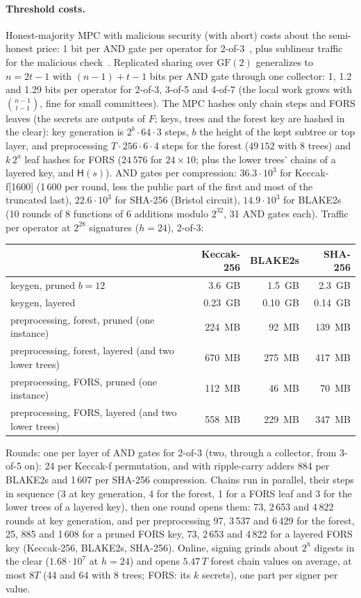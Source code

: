 \documentclass[11pt]{article}
\newcommand{\hash}{\mathsf{H}}
\begin{document}
\paragraph{Threshold costs.} Honest-majority MPC with malicious security (with abort) costs about the semi-honest
price: 1 bit per AND gate per operator for 2-of-3~\cite{AFLNO16}, plus sublinear traffic for the malicious
check~\cite{BGIN19,GS20}. Replicated sharing over $\mathrm{GF}(2)$ generalizes to $n=2t-1$ with $(n-1)+t-1$ bits per
AND gate through one collector: 1, 1.2 and 1.29 bits per operator for 2-of-3, 3-of-5 and 4-of-7 (the local work grows
with $\binom{n-1}{t-1}$, fine for small committees). The MPC hashes only chain steps and FORS leaves (the secrets are outputs
of $F$; keys, trees and the forest key are hashed in the clear): key generation is $2^b\cdot64\cdot3$ steps, $b$ the
height of the kept subtree or top layer, and preprocessing $T\cdot256\cdot6\cdot4$ steps for the forest ($49\,152$
with 8 trees) and $k\,2^a$ leaf hashes for FORS ($24\,576$ for $24\times10$; plus the lower trees' chains of a layered key, and $\hash(s)$). AND gates
per compression: $36.3\cdot10^3$ for Keccak-f[1600] (1\,600 per round,
less the public part of the first and most of the truncated last), $22.6\cdot10^3$ for SHA-256 (Bristol circuit),
$14.9\cdot10^3$ for BLAKE2s (10 rounds of 8 functions of 6 additions modulo $2^{32}$, 31 AND gates each). Traffic per
operator at $2^{28}$ signatures ($h=24$), 2-of-3:
\begin{center}
\begin{tabular}{lrrr}
  \toprule
  & Keccak-256 & BLAKE2s & SHA-256 \\
  \midrule
  keygen, pruned $b=12$ & 3.6~GB & 1.5~GB & 2.3~GB \\
  keygen, layered & 0.23~GB & 0.10~GB & 0.14~GB \\
  preprocessing, forest, pruned (one instance) & 224~MB & 92~MB & 139~MB \\
  preprocessing, forest, layered (and two lower trees) & 670~MB & 275~MB & 417~MB \\
  preprocessing, FORS, pruned (one instance) & 112~MB & 46~MB & 70~MB \\
  preprocessing, FORS, layered (and two lower trees) & 558~MB & 229~MB & 347~MB \\
  \bottomrule
\end{tabular}
\end{center}
Rounds: one per layer of AND gates for 2-of-3 (two, through a collector, from 3-of-5 on): 24 per Keccak-f
permutation, and with ripple-carry adders 884 per BLAKE2s and 1\,607 per SHA-256 compression. Chains run in parallel,
their steps in sequence (3 at key generation, 4 for the forest, 1 for a FORS leaf and 3 for the lower trees of a
layered key), then one round opens them: 73, 2\,653 and 4\,822 rounds at key generation, and per preprocessing 97, 3\,537 and
6\,429 for the forest, 25, 885 and 1\,608 for a pruned FORS key, 73, 2\,653 and 4\,822 for a layered FORS key
(Keccak-256, BLAKE2s, SHA-256). Online, signing
grinds about $2^h$ digests in the clear ($1.68\cdot10^7$ at $h=24$) and opens $5.47\,T$ forest chain values on
average, at most $8T$ (44 and 64 with 8 trees; FORS: its $k$ secrets), one part per signer per value.
\end{document}
